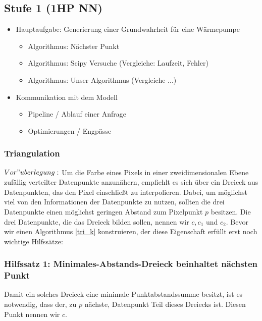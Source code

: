 \documentclass[a4paper]{extarticle}
\begin{document}
    \subsection{Stufe 1 (1HP NN)}
    \begin{itemize}
        \item Hauptaufgabe: Generierung einer Grundwahrheit für eine Wärmepumpe
        \begin{itemize}
            \item Algorithmus: Nächster Punkt
            \item Algorithmus: Scipy Versuche (Vergleiche: Laufzeit, Fehler)
            \item Algorithmus: Unser Algorithmus (Vergleiche ...)
        \end{itemize}
        \item Kommunikation mit dem Modell
        \begin{itemize}
            \item Pipeline / Ablauf einer Anfrage
            \item Optimierungen / Engpässe
        \end{itemize}
    \end{itemize}
    \subsubsection{Triangulation}
    $Vor"uberlegung:$ Um die Farbe eines Pixels in einer zweidimensionalen Ebene zufällig verteilter
    Datenpunkte anzunähern, empfiehlt es sich über ein Dreieck aus Datenpunkten, das den Pixel 
    einschließt zu interpolieren. Dabei, um möglichst viel von den Informationen der Datenpunkte 
    zu nutzen, sollten die drei Datenpunkte einen möglichst geringen Abstand zum Pixelpunkt $p$ 
    besitzen. Die drei Datenpunkte, die das Dreieck bilden sollen, nennen wir $c, c_1$ und $c_2$.
    Bevor wir einen Algorithmus \ref{tri_k} konstruieren, der diese Eigenschaft erfüllt erst noch 
    wichtige Hilfssätze:

    \subsubsection{Hilfssatz 1: Minimales-Abstands-Dreieck beinhaltet nächsten Punkt} \label{tri_hs1}
    Damit ein solches Dreieck eine minimale Punktabstandssumme besitzt,
    ist es notwendig, dass der, zu $p$ nächste, Datenpunkt Teil dieses Dreiecks ist. Diesen Punkt 
    nennen wir $c$.
\end{document}
